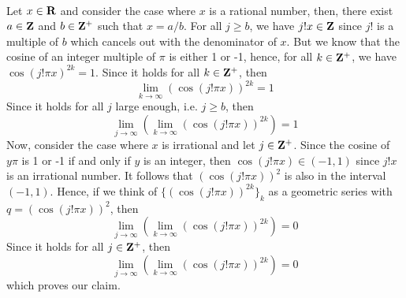 \begin{solution}
    \\ Let $x \in \mathbf{R}$ and consider the case where $x$ is a rational number, then, there exist $a \in \mathbf{Z}$ and $b \in \mathbf{Z}^+$ such that $x = a/b$. For all $j \geq b$, we have $j!x \in \mathbf{Z}$ since $j!$ is a multiple of $b$ which cancels out with the denominator of $x$. But we know that the cosine of an integer multiple of $\pi$ is either 1 or -1, hence, for all $k \in \mathbf{Z}^+$, we have $\cos(j!\pi x)^{2k} = 1$. Since it holds for all $k \in \mathbf{Z}^+$, then
    $$\lim_{k \rightarrow \infty} (\cos(j! \pi x))^{2k} = 1$$
    Since it holds for all $j$ large enough, i.e. $j \geq b$, then
    $$\lim_{j \rightarrow \infty} \left( \lim_{k \rightarrow \infty} (\cos(j! \pi x))^{2k} \right) = 1$$
    Now, consider the case where $x$ is irrational and let $j \in \mathbf{Z}^+$. Since the cosine of $y\pi$ is 1 or -1 if and only if $y$ is an integer, then $\cos(j!\pi x) \in (-1, 1)$ since $j! x$ is an irrational number. It follows that $(\cos(j!\pi x))^2$ is also in the interval $(-1, 1)$. Hence, if we think of $\{(\cos(j!\pi x))^{2k}\}_k$ as a geometric series with $q = (\cos(j!\pi x))^2$, then
    $$\lim_{j \rightarrow \infty} \left( \lim_{k \rightarrow \infty} (\cos(j! \pi x))^{2k} \right) = 0$$
    Since it holds for all $j \in \mathbf{Z}^+$, then
    $$\lim_{j \rightarrow \infty} \left( \lim_{k \rightarrow \infty} (\cos(j! \pi x))^{2k} \right) = 0$$
    which proves our claim. 
\end{solution}
